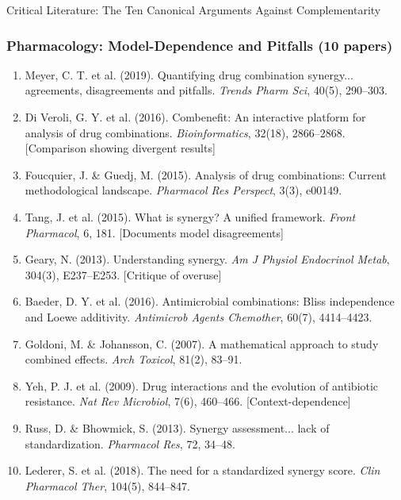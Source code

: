\begin{chapter}{Critical Literature: The Ten Canonical Arguments Against Complementarity}
\subsubsection{Pharmacology: Model-Dependence and Pitfalls (10 papers)}

\begin{enumerate}
    \item Meyer, C. T. et al. (2019). Quantifying drug combination synergy... agreements, disagreements and pitfalls. \textit{Trends Pharm Sci}, 40(5), 290--303.

    \item Di Veroli, G. Y. et al. (2016). Combenefit: An interactive platform for analysis of drug combinations. \textit{Bioinformatics}, 32(18), 2866--2868. [Comparison showing divergent results]

    \item Foucquier, J. \& Guedj, M. (2015). Analysis of drug combinations: Current methodological landscape. \textit{Pharmacol Res Perspect}, 3(3), e00149.

    \item Tang, J. et al. (2015). What is synergy? A unified framework. \textit{Front Pharmacol}, 6, 181. [Documents model disagreements]

    \item Geary, N. (2013). Understanding synergy. \textit{Am J Physiol Endocrinol Metab}, 304(3), E237--E253. [Critique of overuse]

    \item Baeder, D. Y. et al. (2016). Antimicrobial combinations: Bliss independence and Loewe additivity. \textit{Antimicrob Agents Chemother}, 60(7), 4414--4423.

    \item Goldoni, M. \& Johansson, C. (2007). A mathematical approach to study combined effects. \textit{Arch Toxicol}, 81(2), 83--91.

    \item Yeh, P. J. et al. (2009). Drug interactions and the evolution of antibiotic resistance. \textit{Nat Rev Microbiol}, 7(6), 460--466. [Context-dependence]

    \item Russ, D. \& Bhowmick, S. (2013). Synergy assessment... lack of standardization. \textit{Pharmacol Res}, 72, 34--48.

    \item Lederer, S. et al. (2018). The need for a standardized synergy score. \textit{Clin Pharmacol Ther}, 104(5), 844--847.
\end{enumerate}


\end{chapter}
